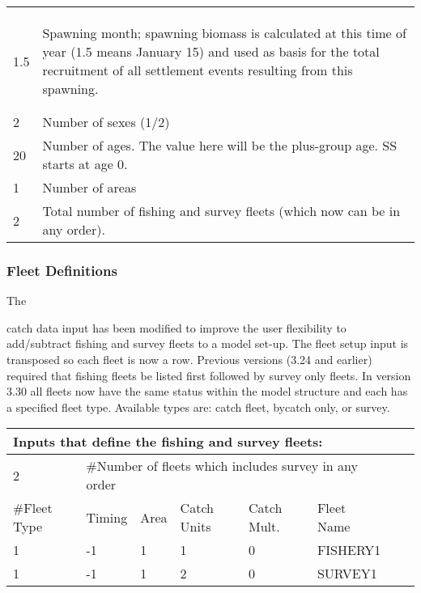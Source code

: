 \begin{center}
\begin{tabular}{p{4cm} p{12cm}}
			& \\
			& \\
			& \\
			\hline
			\hypertarget{RecrTiminig}{1.5} & \multirow{1}{1cm}[-0.1cm]{\parbox{12cm}{Spawning month; spawning biomass is calculated at this time of year (1.5 means January 15) and used as basis for the total recruitment of all settlement events resulting from this spawning.}}\\
			& \\
			& \\
			\hline
			2 & Number of sexes (1/2) \\
			\hline
			20 & Number of ages. The value here will be the plus-group age.  SS starts at age 0. \\
			\hline
			1 & Number of areas \\
			\hline
			2 & Total number of fishing and survey fleets (which now can be in any order).\\
			\hline
	\end{tabular}
\end{center}


\subsubsection{Fleet Definitions }
\hypertarget{GenericFleets}{The} catch data input has been modified to improve the user flexibility to add/subtract fishing and survey fleets to a model set-up.  The fleet setup input is transposed so each fleet is now a row.  Previous versions (3.24 and earlier) required that fishing fleets be listed first followed by survey only fleets.  In version 3.30 all fleets now have the same status within the model structure and each has a specified fleet type.  Available types are: catch fleet, bycatch only, or survey.  

\begin{center}
	\begin{tabular}{p{2cm} p{2cm} p{2cm} p{2cm} p{2cm} p{2cm} p{2cm} p{2.5cm}}
		\multicolumn{6}{l}{Inputs that define the fishing and survey fleets:}\\
		\hline
		2 & \multicolumn{5}{l}{\#Number of fleets which includes survey in any order} \\
		\hline
		\#Fleet Type & Timing & Area & Catch Units & Catch Mult. & Fleet Name \\

		\hline
		1 & -1 & 1 & 1 & 0 & FISHERY1\\
		1 & -1 & 1 & 2 & 0 & SURVEY1\\
		\hline
		
	\end{tabular}
\end{center}

